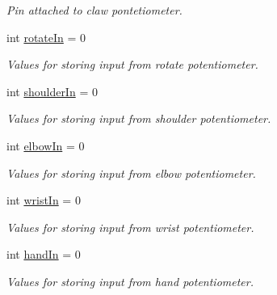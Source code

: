 \begin{DoxyCompactItemize}
\begin{DoxyCompactList}\small\item\em Pin attached to claw pontetiometer. \end{DoxyCompactList}\item 
\hypertarget{_full___robot___code_8ino_aed489013b293d84291b243d9052c776d}{int \hyperlink{_full___robot___code_8ino_aed489013b293d84291b243d9052c776d}{rotate\-In} = 0}\label{_full___robot___code_8ino_aed489013b293d84291b243d9052c776d}

\begin{DoxyCompactList}\small\item\em Values for storing input from rotate potentiometer. \end{DoxyCompactList}\item 
\hypertarget{_full___robot___code_8ino_a661efe6cc4466f3d52a4edf588c74ded}{int \hyperlink{_full___robot___code_8ino_a661efe6cc4466f3d52a4edf588c74ded}{shoulder\-In} = 0}\label{_full___robot___code_8ino_a661efe6cc4466f3d52a4edf588c74ded}

\begin{DoxyCompactList}\small\item\em Values for storing input from shoulder potentiometer. \end{DoxyCompactList}\item 
\hypertarget{_full___robot___code_8ino_aabe17e9e37ac66b6c44944d69bab4a60}{int \hyperlink{_full___robot___code_8ino_aabe17e9e37ac66b6c44944d69bab4a60}{elbow\-In} = 0}\label{_full___robot___code_8ino_aabe17e9e37ac66b6c44944d69bab4a60}

\begin{DoxyCompactList}\small\item\em Values for storing input from elbow potentiometer. \end{DoxyCompactList}\item 
\hypertarget{_full___robot___code_8ino_ab5aecef42968c07c245fb183e33f4b38}{int \hyperlink{_full___robot___code_8ino_ab5aecef42968c07c245fb183e33f4b38}{wrist\-In} = 0}\label{_full___robot___code_8ino_ab5aecef42968c07c245fb183e33f4b38}

\begin{DoxyCompactList}\small\item\em Values for storing input from wrist potentiometer. \end{DoxyCompactList}\item 
\hypertarget{_full___robot___code_8ino_a0db2501e223e7a9c9b208fafd62af284}{int \hyperlink{_full___robot___code_8ino_a0db2501e223e7a9c9b208fafd62af284}{hand\-In} = 0}\label{_full___robot___code_8ino_a0db2501e223e7a9c9b208fafd62af284}

\begin{DoxyCompactList}\small\item\em Values for storing input from hand potentiometer. \end{DoxyCompactList}\end{DoxyCompactItemize}


